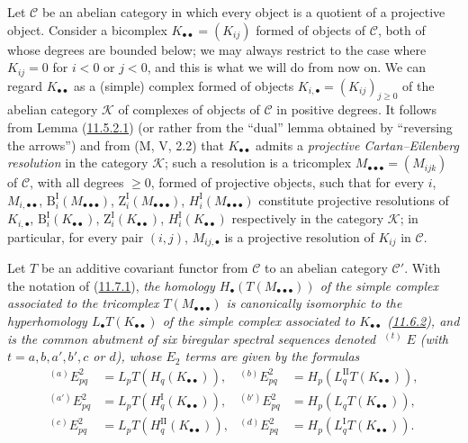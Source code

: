 \begin{env}[11.7.1]
\label{0.11.7.1}
Let $\mathcal C$ be an abelian category in which every object is a
quotient of a projective object. Consider a bicomplex
$K_{\bullet\bullet}=(K_{ij})$ formed of objects of $\mathcal C$, both of whose
degrees are bounded below; we may always restrict to the case where
$K_{ij}=0$ for $i<0$ or $j<0$, and this is what we will do from now on. We
can regard $K_{\bullet\bullet}$ as a (simple) complex formed of
objects $K_{i,\bullet}=(K_{ij})_{j\geq 0}$ of the abelian category
$\mathcal K$ of complexes of objects of $\mathcal C$ in positive degrees. It
follows from Lemma (\hyperref[0.11.5.2.1]{11.5.2.1}) (or rather from the
``dual'' lemma obtained by ``reversing the arrows'') and from (M, V, 2.2) that
$K_{\bullet\bullet}$ admits a \emph{projective Cartan--Eilenberg
resolution} in the category $\mathcal K$; such a resolution is a
tricomplex $M_{\bullet\bullet\bullet}=(M_{ijk})$ of $\mathcal C$, with
all degrees $\geq 0$, formed of projective objects, such that for every $i$,
$M_{i,\bullet\bullet}$, $\mathrm B_i^{\mathrm I}(M_{\bullet\bullet\bullet})$,
$\mathrm Z_i^{\mathrm I}(M_{\bullet\bullet\bullet})$,
$H_i^{\mathrm I}(M_{\bullet\bullet\bullet})$ constitute projective
resolutions of $K_{i,\bullet}$,
$\mathrm B_i^{\mathrm I}(K_{\bullet\bullet})$,
$\mathrm Z_i^{\mathrm I}(K_{\bullet\bullet})$,
$H_i^{\mathrm I}(K_{\bullet\bullet})$ respectively in the category
$\mathcal K$; in particular, for every pair $(i,j)$,
$M_{ij,\bullet}$ is a projective resolution of $K_{ij}$ in
$\mathcal C$.
\end{env}

\begin{proposition}[11.7.2]
\label{0.11.7.2}
Let $T$ be an additive covariant functor from $\mathcal C$ to an abelian
category $\mathcal C'$. With the notation of
(\hyperref[0.11.7.1]{11.7.1}), \emph{the homology
$H_\bullet(T(M_{\bullet\bullet\bullet}))$ of the simple complex associated to
the tricomplex $T(M_{\bullet\bullet\bullet})$ is canonically isomorphic to
the hyperhomology $L_\bullet T(K_{\bullet\bullet})$ of the simple
complex associated to $K_{\bullet\bullet}$
(\hyperref[0.11.6.2]{11.6.2}), and is
the common abutment of six biregular spectral sequences denoted
$\mathop{}^{(t)}E$ (with $t=a,b,a',b',c$ or $d$), whose $E_2$ terms are
given by the formulas}
\[
\begin{aligned}
{}^{(a)}E^2_{pq}&=L_pT(H_q(K_{\bullet\bullet})),&
{}^{(b)}E^2_{pq}&=H_p(L_q^{\mathrm{II}}T(K_{\bullet\bullet})),\\
{}^{(a')}E^2_{pq}&=L_pT(H_q^{\mathrm I}(K_{\bullet\bullet})),&
{}^{(b')}E^2_{pq}&=H_p(L_qT(K_{\bullet\bullet})),\\
{}^{(c)}E^2_{pq}&=L_pT(H_q^{\mathrm{II}}(K_{\bullet\bullet})),&
{}^{(d)}E^2_{pq}&=H_p(L_q^{\mathrm I}T(K_{\bullet\bullet})).
\end{aligned}
\]
\end{proposition}

